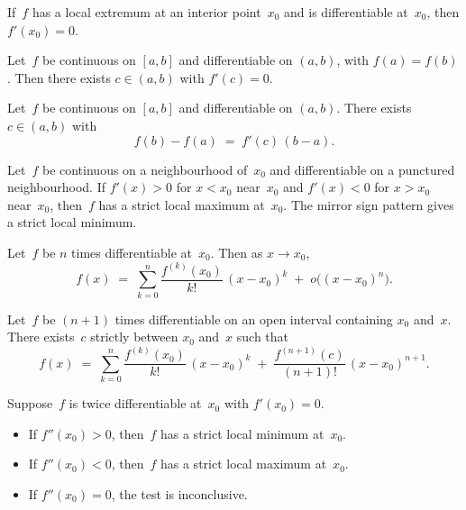 \begin{theorem}[Fermat]
\label{thm:fermat}
If~$f$ has a local extremum at an interior point~$x_0$ and is
differentiable at~$x_0$, then $f'(x_0) = 0$.
\end{theorem}

\begin{theorem}[Rolle]
\label{thm:rolle}
Let~$f$ be continuous on $[a, b]$ and differentiable on $(a, b)$,
with $f(a) = f(b)$. Then there exists $c \in (a, b)$ with
$f'(c) = 0$.
\end{theorem}

\begin{theorem}
\label{thm:lagrange-mvt}
Let~$f$ be continuous on $[a, b]$ and differentiable on $(a, b)$.
There exists $c \in (a, b)$ with
\[
  f(b) - f(a) \;=\; f'(c)\,(b - a).
\]
\end{theorem}

\begin{theorem}
\label{thm:first-deriv-test}
Let~$f$ be continuous on a neighbourhood of~$x_0$ and differentiable
on a punctured neighbourhood. If $f'(x) > 0$ for $x < x_0$ near~$x_0$
and $f'(x) < 0$ for $x > x_0$ near~$x_0$, then~$f$ has a strict
local maximum at~$x_0$. The mirror sign pattern gives a strict local
minimum.
\end{theorem}

\begin{theorem}
\label{thm:taylor-peano}
Let~$f$ be $n$ times differentiable at~$x_0$. Then as $x \to x_0$,
\[
  f(x) \;=\; \sum_{k=0}^{n} \frac{f^{(k)}(x_0)}{k!}\,(x - x_0)^k \;+\; o\bigl((x - x_0)^n\bigr).
\]
\end{theorem}

\begin{theorem}
\label{thm:taylor-lagrange}
Let~$f$ be $(n+1)$ times differentiable on an open interval
containing $x_0$ and~$x$. There exists~$c$ strictly between $x_0$
and~$x$ such that
\[
  f(x) \;=\; \sum_{k=0}^{n} \frac{f^{(k)}(x_0)}{k!}\,(x - x_0)^k
  \;+\; \frac{f^{(n+1)}(c)}{(n+1)!}\,(x - x_0)^{n+1}.
\]
\end{theorem}

\begin{corollary}
\label{cor:second-deriv-test}
Suppose~$f$ is twice differentiable at~$x_0$ with $f'(x_0) = 0$.
\begin{itemize}
  \item If $f''(x_0) > 0$, then~$f$ has a strict local minimum at~$x_0$.
  \item If $f''(x_0) < 0$, then~$f$ has a strict local maximum at~$x_0$.
  \item If $f''(x_0) = 0$, the test is inconclusive.
\end{itemize}
\end{corollary}


